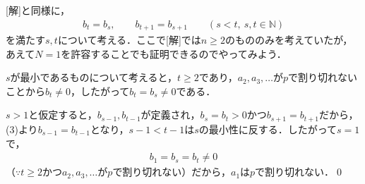 \documentclass[../../main.tex]{subfiles}
\begin{document}
[解]と同様に，
\begin{align}
  b_t=b_s,\qquad b_{t+1}=b_{s+1}\qquad(s<t,\ s,t\in\mathbb N)
\end{align}
を満たす$s,t$について考える．ここで[解]では$n \ge 2$のもののみを考えていたが，あえて$N=1$を許容することでも証明できるのでやってみよう．

$s$が最小であるものについて考えると，$t \ge 2$であり，$a_2,a_3,\ldots$が$p$で割り切れないことから$b_t\ne0$，したがって$b_t=b_s\ne0$である．

$s>1$と仮定すると，$b_{s-1},b_{t-1}$が定義され，$b_s=b_t>0$かつ$b_{s+1}=b_{t+1}$だから，(3)より$b_{s-1}=b_{t-1}$となり，$s-1<t-1$は$s$の最小性に反する．したがって$s=1$で，
\begin{align}
  b_1=b_s=b_t\ne0
\end{align}
（$\because t\ge2$かつ$a_2,a_3,\ldots$が$p$で割り切れない）だから，$a_1$は$p$で割り切れない．\qed
\end{document}

